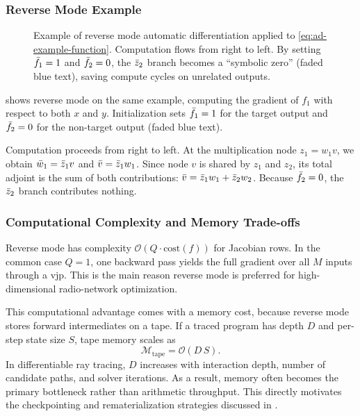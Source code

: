 \subsubsection{Reverse Mode Example}

\begin{figure}
  \centering
  \caption{Example of reverse mode automatic differentiation applied to \eqref{eq:ad-example-function}. Computation flows from right to left. By setting $\bar{f}_1 = 1$ and $\bar{f}_2 = 0$, the $\bar{z}_2$ branch becomes a \enquote{symbolic zero} (faded blue text), saving compute cycles on unrelated outputs.}
\end{figure}

 shows reverse mode on the same example, computing the gradient of $f_1$ with respect to both $x$ and $y$. Initialization sets $\bar{f}_1=1$ for the target output and $\bar{f}_2=0$ for the non-target output (faded blue text).

Computation proceeds from right to left. At the multiplication node $z_1=w_1v$, we obtain $\bar{w}_1=\bar{z}_1v$ and $\bar{v}=\bar{z}_1w_1$. Since node $v$ is shared by $z_1$ and $z_2$, its total adjoint is the sum of both contributions: $\bar{v}=\bar{z}_1w_1+\bar{z}_2w_2$. Because $\bar{f}_2=0$, the $\bar{z}_2$ branch contributes nothing.

\subsubsection{Computational Complexity and Memory Trade-offs}

Reverse mode has complexity $\mathcal{O}(Q\cdot\text{cost}(f))$ for Jacobian rows. In the common case $Q=1$, one backward pass yields the full gradient over all $M$ inputs through a \gls{vjp}. This is the main reason reverse mode is preferred for high-dimensional radio-network optimization.

This computational advantage comes with a memory cost, because reverse mode stores forward intermediates on a tape. If a traced program has depth $D$ and per-step state size $S$, tape memory scales as
\begin{equation}
  \mathcal{M}_{\text{tape}} = \mathcal{O}(D\,S).
\end{equation}
In differentiable ray tracing, $D$ increases with interaction depth, number of candidate paths, and solver iterations. As a result, memory often becomes the primary bottleneck rather than arithmetic throughput. This directly motivates the checkpointing and rematerialization strategies discussed in .

